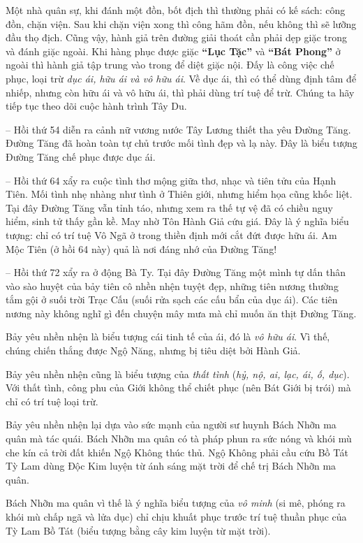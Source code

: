 Một nhà quân sự, khi đánh một đồn, bốt địch thì thường phải có kế sách: công đồn, chặn viện. Sau khi chặn viện xong thì công hãm đồn, nếu không thì sẽ lưỡng đầu thọ địch. Cũng vậy, hành giả trên đường giải thoát cần phải dẹp giặc trong và đánh giặc ngoài. Khi hàng phục được giặc {\bf ``Lục Tặc''} và {\bf ``Bát Phong''} ở ngoài thì hành giả tập trung vào trong để diệt giặc nội. Đấy là công việc chế phục, loại trừ \emph{dục ái, hữu ái và vô hữu ái}. Về dục ái, thì có thể dùng định tâm để nhiếp, nhưng còn hữu ái và vô hữu ái, thì phải dùng trí tuệ để trừ. Chúng ta hãy tiếp tục theo dõi cuộc hành trình Tây Du.

-- Hồi thứ 54 diễn ra cảnh nữ vương nước Tây Lương thiết tha yêu Đường Tăng. Đường Tăng đã hoàn toàn tự chủ trước mối tình đẹp và lạ này. Đây là biểu tượng Đường Tăng chế phục được dục ái.

-- Hồi thứ 64 xẩy ra cuộc tình thơ mộng giữa thơ, nhạc và tiên tửu của Hạnh Tiên. Mối tình nhẹ nhàng như tình ở Thiên giới, nhưng hiểm họa cũng khốc liệt. Tại đây Đường Tăng vẫn tỉnh táo, nhưng xem ra thế tự vệ đã có chiều nguy hiểm, sinh tử thấy gần kề. May nhờ Tôn Hành Giả cứu giá. Đây là ý nghĩa biểu tượng: chỉ có trí tuệ Vô Ngã ở trong thiền định mới cắt đứt được hữu ái. Am Mộc Tiên (ở hồi 64 này) quả là nơi đáng nhớ của Đường Tăng!

-- Hồi thứ 72 xẩy ra ở động Bà Ty. Tại đây Đường Tăng một mình tự dấn thân vào sào huyệt của bảy tiên cô nhền nhện tuyệt đẹp, những tiên nương thường tắm gội ở suối trời Trạc Cấu (suối rửa sạch các cấu bẩn của dục ái). Các tiên nương này không nghĩ gì đến chuyện mây mưa mà chỉ muốn ăn thịt Đường Tăng.

Bảy yêu nhền nhện là biểu tượng cái tinh tế của ái, đó là \emph{vô hữu ái}. Vì thế, chúng chiến thắng được Ngộ Năng, nhưng bị tiêu diệt bởi Hành Giả.

Bảy yêu nhền nhện cũng là biểu tượng của \emph{thất tình} (\emph{hỷ, nộ, ai, lạc, ái, ố, dục}). Với thất tình, công phu của Giới không thể chiết phục (nên Bát Giới bị trói) mà chỉ có trí tuệ loại trừ.

Bảy yêu nhền nhện lại dựa vào sức mạnh của người sư huynh Bách Nhỡn ma quân mà tác quái. Bách Nhỡn ma quân có tà pháp phun ra sức nóng và khói mù che kín cả trời đất khiến Ngộ Không thúc thủ. Ngộ Không phải cầu cứu Bồ Tát Tỳ Lam dùng Độc Kim luyện từ ánh sáng mặt trời để chế trị Bách Nhỡn ma quân.

Bách Nhỡn ma quân vì thế là ý nghĩa biểu tượng của \emph{vô minh} (si mê, phóng ra khói mù chấp ngã và lửa dục) chỉ chịu khuất phục trước trí tuệ thuần phục của Tỳ Lam Bồ Tát (biểu tượng bằng cây kim luyện từ mặt trời).

